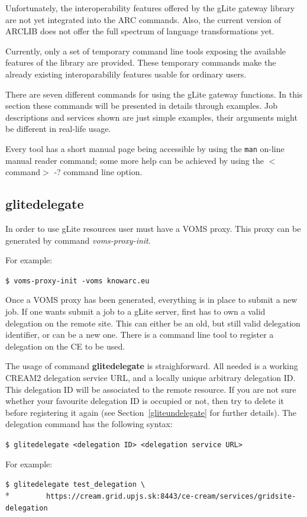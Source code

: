 \documentclass{article}
\begin{document}
Unfortunately, the interoperability features offered by the gLite gateway library are not yet integrated into the ARC commands. Also, the current version of ARCLIB does not offer the full spectrum of language transformations yet.

Currently, only a set of temporary command line tools exposing the available features of the library are provided. These temporary commands make the already existing interoparabilily features usable for ordinary users.

There are seven different commands for using the gLite gateway functions. In this section these commands will be presented in details through examples. Job descriptions and services shown are just simple examples, their arguments might be different in real-life usage.

Every tool has a short manual page being accessible by using the \texttt{man} on-line manual reader command; some more help can be achieved by using the $<$command$>$ -? command line option.

\subsection{glitedelegate}
\label{glitedelegate}
In order to use gLite resources user must have a VOMS proxy. This proxy can be generated by command \textit{voms-proxy-init}.

For example:
\begin{shaded}\verb#$ voms-proxy-init -voms knowarc.eu#\end{shaded}%
Once a VOMS proxy has been generated, everything is in place to submit a new job. If one wants submit a job to a gLite server, first has to own a valid delegation on the remote site. This can either be an old, but still valid delegation identifier, or can be a new one. There is a command line tool to register a delegation on the CE to be used.

The usage of command \textbf{glitedelegate} is straighforward. All needed is a working CREAM2 delegation service URL, and a locally unique arbitrary delegation ID. This delegation ID will be associated to the remote resource. If you are not sure whether your favourite delegation ID is occupied or not, then try to delete it before registering it again (see Section~\ref{gliteundelegate} for further details). The delegation command has the following syntax:
\begin{shaded}\verb#$ glitedelegate <delegation ID> <delegation service URL>#\end{shaded}%
For example:
\begin{shaded}\verb#$ glitedelegate test_delegation \#\\*
\verb#        https://cream.grid.upjs.sk:8443/ce-cream/services/gridsite-delegation#\end{shaded}%
\end{document}
